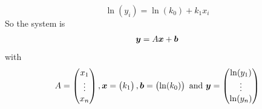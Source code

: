 \documentclass[aspectratio=169]{beamer}\usepackage[]{graphicx}\usepackage[]{xcolor}
\begin{document}
\begin{frame}
\[
\ln(y_i) = \ln (k_0)+k_1x_i
\]
So the system is
\begin{align*}
\bm{y} = A\bm{x}+\bm{b}
\end{align*}
with
\[
A = \begin{pmatrix}
x_1\\ \vdots \\ x_n
\end{pmatrix},
\bm{x} = \begin{pmatrix}
k_1
\end{pmatrix},
\bm{b} = \begin{pmatrix}
\ln (k_0)
\end{pmatrix}
\textrm{ and }
\bm{y} = \begin{pmatrix}
\ln (y_1)\\ \vdots\\ \ln (y_n)
\end{pmatrix}
\]
\end{frame}








\end{document}
